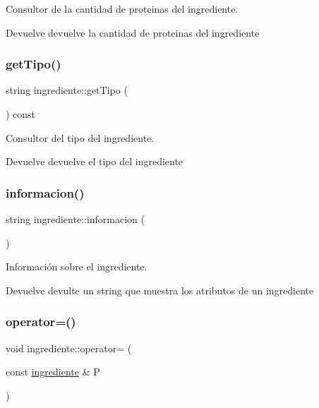 Consultor de la cantidad de proteinas del ingrediente. 

\begin{DoxyReturn}{Devuelve}
devuelve la cantidad de proteinas del ingrediente 
\end{DoxyReturn}
\mbox{\label{classingrediente_a03334e887add1dbdc7991de77234ede7}} 
\subsubsection{\texorpdfstring{get\+Tipo()}{getTipo()}}
{\footnotesize\ttfamily string ingrediente\+::get\+Tipo (\begin{DoxyParamCaption}{ }\end{DoxyParamCaption}) const}



Consultor del tipo del ingrediente. 

\begin{DoxyReturn}{Devuelve}
devuelve el tipo del ingrediente 
\end{DoxyReturn}
\mbox{\label{classingrediente_a51a8da90674bb8d5f3c4019e87ad5e67}} 
\subsubsection{\texorpdfstring{informacion()}{informacion()}}
{\footnotesize\ttfamily string ingrediente\+::informacion (\begin{DoxyParamCaption}{ }\end{DoxyParamCaption})}



Información sobre el ingrediente. 

\begin{DoxyReturn}{Devuelve}
devulte un string que muestra los atributos de un ingrediente 
\end{DoxyReturn}
\mbox{\label{classingrediente_a0556714d34bdd366599fc02758b6d046}} 
\subsubsection{\texorpdfstring{operator=()}{operator=()}}
{\footnotesize\ttfamily void ingrediente\+::operator= (\begin{DoxyParamCaption}\item[{const \hyperlink{classingrediente}{ingrediente} \&}]{P }\end{DoxyParamCaption})}



